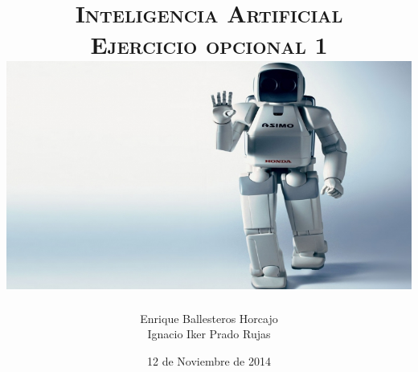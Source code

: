 \documentclass[11pt, a4paper, spanish, openright, twoside]{book}
\begin{document}
 
\title{\Huge{\textsc{Inteligencia Artificial}} \\
	\vspace{0.7cm}
	 \textsc{\Large{Ejercicio opcional 1}} \\
	\vspace{1.5cm}
	\includegraphics[scale=0.45]{robotHonda}}
\author{Enrique Ballesteros Horcajo\\
	Ignacio Iker Prado Rujas}
\date{12 de Noviembre de 2014}
\maketitle

\newpage
\mbox{}
\thispagestyle{empty}						%
\newpage


\tableofcontents 							%

\newpage
\mbox{}
\thispagestyle{empty}						%
\newpage


\vspace{3cm}


\newpage
\end{document}
